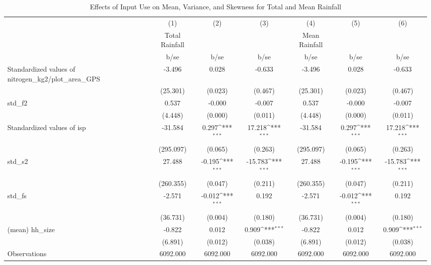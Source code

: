 \begin{table}[htbp]\centering
\def\sym#1{\ifmmode^{#1}\else\(^{#1}\)\fi}
\caption{Effects of Input Use on Mean, Variance, and Skewness for Total and Mean Rainfall}
\begin{tabular}{l*{6}{c}}
\toprule
                &\multicolumn{1}{c}{(1)}&\multicolumn{1}{c}{(2)}&\multicolumn{1}{c}{(3)}&\multicolumn{1}{c}{(4)}&\multicolumn{1}{c}{(5)}&\multicolumn{1}{c}{(6)}\\
                &\multicolumn{1}{c}{Total Rainfall}&\multicolumn{1}{c}{}&\multicolumn{1}{c}{}&\multicolumn{1}{c}{Mean Rainfall}&\multicolumn{1}{c}{}&\multicolumn{1}{c}{}\\
                &     b/se         &     b/se         &     b/se         &     b/se         &     b/se         &     b/se         \\
\midrule
Standardized values of nitrogen\_kg2/plot\_area\_GPS&   -3.496         &    0.028         &   -0.633         &   -3.496         &    0.028         &   -0.633         \\
                & (25.301)         &  (0.023)         &  (0.467)         & (25.301)         &  (0.023)         &  (0.467)         \\
std\_f2          &    0.537         &   -0.000         &   -0.007         &    0.537         &   -0.000         &   -0.007         \\
                &  (4.448)         &  (0.000)         &  (0.011)         &  (4.448)         &  (0.000)         &  (0.011)         \\
Standardized values of isp&  -31.584         &    0.297\sym{***}&   17.218\sym{***}&  -31.584         &    0.297\sym{***}&   17.218\sym{***}\\
                &(295.097)         &  (0.065)         &  (0.263)         &(295.097)         &  (0.065)         &  (0.263)         \\
std\_s2          &   27.488         &   -0.195\sym{***}&  -15.783\sym{***}&   27.488         &   -0.195\sym{***}&  -15.783\sym{***}\\
                &(260.355)         &  (0.047)         &  (0.211)         &(260.355)         &  (0.047)         &  (0.211)         \\
std\_fs          &   -2.571         &   -0.012\sym{***}&    0.192         &   -2.571         &   -0.012\sym{***}&    0.192         \\
                & (36.731)         &  (0.004)         &  (0.180)         & (36.731)         &  (0.004)         &  (0.180)         \\
(mean) hh\_size  &   -0.822         &    0.012         &    0.909\sym{***}&   -0.822         &    0.012         &    0.909\sym{***}\\
                &  (6.891)         &  (0.012)         &  (0.038)         &  (6.891)         &  (0.012)         &  (0.038)         \\
\midrule
Observations    & 6092.000         & 6092.000         & 6092.000         & 6092.000         & 6092.000         & 6092.000         \\
\bottomrule
\end{tabular}
\end{table}
